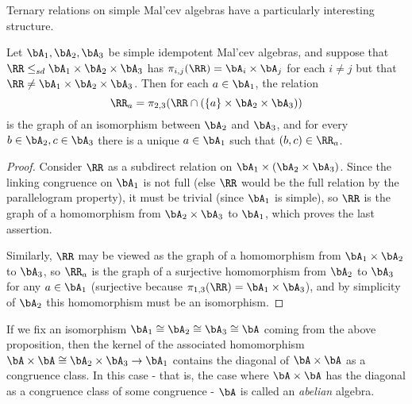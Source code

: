 Ternary relations on simple Mal'cev algebras have a particularly interesting structure.

\begin{prop} Let $\bA_1, \bA_2, \bA_3$ be simple idempotent Mal'cev algebras, and suppose that $\RR\le_{sd} \bA_1\times\bA_2\times\bA_3$ has $\pi_{i,j}(\RR) = \bA_i\times\bA_j$ for each $i\ne j$ but that $\RR \ne \bA_1\times\bA_2\times\bA_3$. Then for each $a \in \bA_1$, the relation
\[
\RR_a = \pi_{2,3}(\RR \cap (\{a\}\times \bA_2\times \bA_3))
\]
is the graph of an isomorphism between $\bA_2$ and $\bA_3$, and for every $b \in \bA_2, c \in \bA_3$ there is a unique $a \in \bA_1$ such that $(b,c) \in \RR_a$.
\end{prop}
\begin{proof} Consider $\RR$ as a subdirect relation on $\bA_1\times (\bA_2\times \bA_3)$. Since the linking congruence on $\bA_1$ is not full (else $\RR$ would be the full relation by the parallelogram property), it must be trivial (since $\bA_1$ is simple), so $\RR$ is the graph of a homomorphism from $\bA_2\times \bA_3$ to $\bA_1$, which proves the last assertion.

Similarly, $\RR$ may be viewed as the graph of a homomorphism from $\bA_1\times \bA_2$ to $\bA_3$, so $\RR_a$ is the graph of a surjective homomorphism from $\bA_2$ to $\bA_3$ for any $a \in \bA_1$ (surjective because $\pi_{1,3}(\RR) = \bA_1 \times \bA_3$), and by simplicity of $\bA_2$ this homomorphism must be an isomorphism.
\end{proof}

If we fix an isomorphism $\bA_1 \cong \bA_2 \cong \bA_3 \cong \bA$ coming from the above proposition, then the kernel of the associated homomorphism $\bA \times \bA \cong \bA_2\times \bA_3 \rightarrow \bA_1$ contains the diagonal of $\bA\times \bA$ as a congruence class. In this case - that is, the case where $\bA\times\bA$ has the diagonal as a congruence class  of some congruence - $\bA$ is called an \emph{abelian} algebra.%


